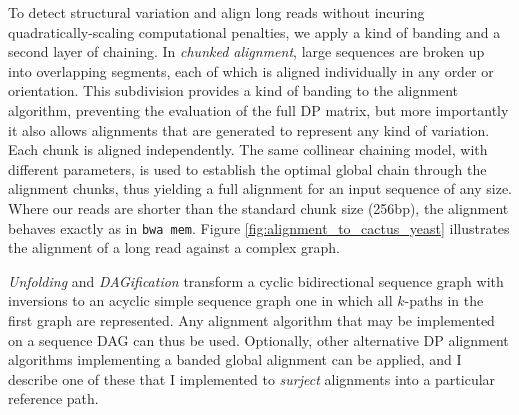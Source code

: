 To detect structural variation and align long reads without incuring quadratically-scaling computational penalties, we apply a kind of banding and a second layer of chaining.
In \emph{chunked alignment}, large sequences are broken up into overlapping segments, each of which is aligned individually in any order or orientation.
This subdivision provides a kind of banding to the alignment algorithm, preventing the evaluation of the full DP matrix, but more importantly it also allows alignments that are generated to represent any kind of variation.
Each chunk is aligned independently.
The same collinear chaining model, with different parameters, is used to establish the optimal global chain through the alignment chunks, thus yielding a full alignment for an input sequence of any size.
Where our reads are shorter than the standard chunk size (256bp), the alignment behaves exactly as in {\tt bwa mem}.
Figure \ref{fig:alignment_to_cactus_yeast} illustrates the alignment of a long read against a complex graph.

\emph{Unfolding} and \emph{DAGification} transform a cyclic bidirectional sequence graph with inversions to an acyclic simple sequence graph one in which all $k$-paths in the first graph are represented.
Any alignment algorithm that may be implemented on a sequence DAG can thus be used.
Optionally, other alternative DP alignment algorithms implementing a banded global alignment can be applied, and I describe one of these that I implemented to \emph{surject} alignments into a particular reference path.

